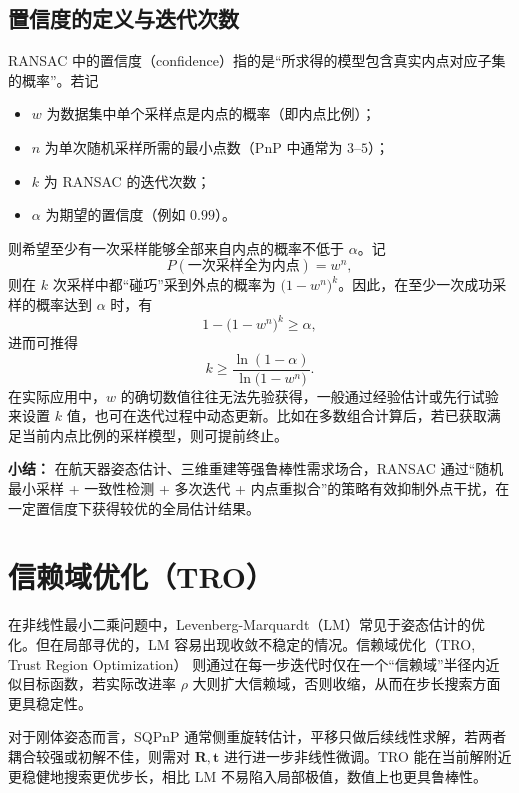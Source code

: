 \subsection{置信度的定义与迭代次数}
RANSAC 中的置信度（confidence）指的是“所求得的模型包含真实内点对应子集的概率”。若记
\begin{itemize}
	\item $w$ 为数据集中单个采样点是内点的概率（即内点比例）；
	\item $n$ 为单次随机采样所需的最小点数（PnP 中通常为 $3$--$5$）；
	\item $k$ 为 RANSAC 的迭代次数；
	\item $\alpha$ 为期望的置信度（例如 $0.99$）。
\end{itemize}
则希望至少有一次采样能够全部来自内点的概率不低于 $\alpha$。记
\begin{equation}
	P(\text{一次采样全为内点})  =  w^n,
\end{equation}
则在 $k$ 次采样中都“碰巧”采到外点的概率为 $\bigl(1 - w^n \bigr)^k$。因此，在至少一次成功采样的概率达到 $\alpha$ 时，有
\begin{equation}
	1 - \bigl(1 - w^n \bigr)^k   \ge   \alpha,
\end{equation}
进而可推得
\begin{equation}
	k  \ge  \frac{\ln(1 - \alpha)}{\ln\bigl(1 - w^n\bigr)}.
\end{equation}
在实际应用中，$w$ 的确切数值往往无法先验获得，一般通过经验估计或先行试验来设置 $k$ 值，也可在迭代过程中动态更新。比如在多数组合计算后，若已获取满足当前内点比例的采样模型，则可提前终止。


\vspace{1em}
\noindent
\textbf{小结：}  
在航天器姿态估计、三维重建等强鲁棒性需求场合，RANSAC 通过“随机最小采样 + 一致性检测 + 多次迭代 + 内点重拟合”的策略有效抑制外点干扰，在一定置信度下获得较优的全局估计结果。


\section{信赖域优化（TRO）}
\label{sec:RANSAC-TRO-SQPnP:TRO}
在非线性最小二乘问题中，Levenberg-Marquardt（LM）常见于姿态估计的优化。但在局部寻优的，LM 容易出现收敛不稳定的情况。信赖域优化（TRO, Trust Region Optimization）\cite{trf} 则通过在每一步迭代时仅在一个“信赖域”半径内近似目标函数，若实际改进率 $\rho$ 大则扩大信赖域，否则收缩，从而在步长搜索方面更具稳定性。

对于刚体姿态而言，SQPnP 通常侧重旋转估计，平移只做后续线性求解，若两者耦合较强或初解不佳，则需对 $\mathbf{R}, \mathbf{t}$ 进行进一步非线性微调。TRO 能在当前解附近更稳健地搜索更优步长，相比 LM 不易陷入局部极值，数值上也更具鲁棒性。

